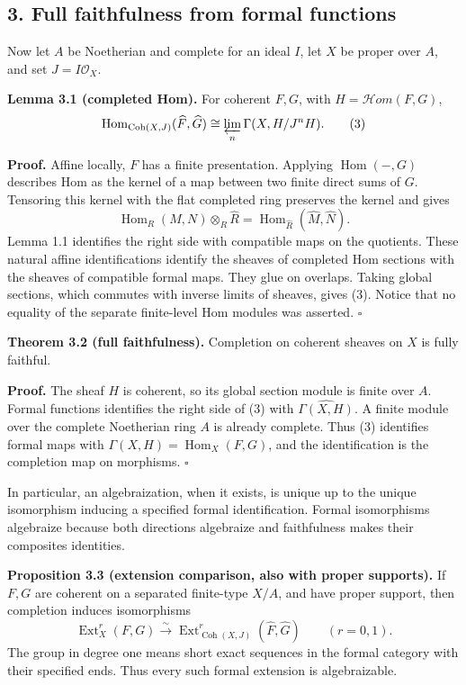 \documentclass[11pt]{article}
\begin{document}
\subsection{3. Full faithfulness from formal
functions}\label{full-faithfulness-from-formal-functions}

Now let \(A\) be Noetherian and complete for an ideal \(I\), let \(X\)
be proper over \(A\), and set \(J=I\mathcal O_X\).

\textbf{Lemma 3.1 (completed Hom).} For coherent \(F,G\), with
\(H=\mathcal Hom(F,G)\), \[
\operatorname{Hom}_{\operatorname{Coh}(X,J)}(\widehat F,\widehat G)
\cong\varprojlim_n\Gamma(X,H/J^nH).
\tag{3}
\]

\textbf{Proof.} Affine locally, \(F\) has a finite presentation.
Applying \(\operatorname{Hom}(-,G)\) describes Hom as the kernel of a
map between two finite direct sums of \(G\). Tensoring this kernel with
the flat completed ring preserves the kernel and gives \[
\operatorname{Hom}_R(M,N)\otimes_R\widehat R
=\operatorname{Hom}_{\widehat R}(\widehat M,\widehat N).
\] Lemma 1.1 identifies the right side with compatible maps on the
quotients. These natural affine identifications identify the sheaves of
completed Hom sections with the sheaves of compatible formal maps. They
glue on overlaps. Taking global sections, which commutes with inverse
limits of sheaves, gives (3). Notice that no equality of the separate
finite-level Hom modules was asserted. \(\square\)

\textbf{Theorem 3.2 (full faithfulness).} Completion on coherent sheaves
on \(X\) is fully faithful.

\textbf{Proof.} The sheaf \(H\) is coherent, so its global section
module is finite over \(A\). Formal functions identifies the right side
of (3) with \(\widehat{\Gamma(X,H)}\). A finite module over the complete
Noetherian ring \(A\) is already complete. Thus (3) identifies formal
maps with \(\Gamma(X,H)=\operatorname{Hom}_X(F,G)\), and the
identification is the completion map on morphisms. \(\square\)

In particular, an algebraization, when it exists, is unique up to the
unique isomorphism inducing a specified formal identification. Formal
isomorphisms algebraize because both directions algebraize and
faithfulness makes their composites identities.

\textbf{Proposition 3.3 (extension comparison, also with proper
supports).} If \(F,G\) are coherent on a separated finite-type \(X/A\),
and have proper support, then completion induces isomorphisms \[
\operatorname{Ext}^r_X(F,G)
\xrightarrow{\sim}
\operatorname{Ext}^r_{\operatorname{Coh}(X,J)}(\widehat F,\widehat G)
\qquad(r=0,1).
\] The group in degree one means short exact sequences in the formal
category with their specified ends. Thus every such formal extension is
algebraizable.
\end{document}
